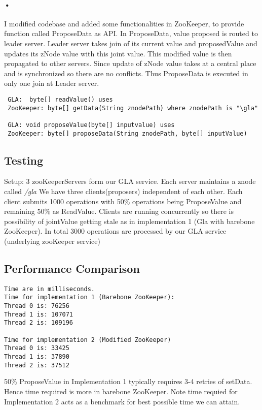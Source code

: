 \documentclass[a4paper,12pt]{report}
\begin{document}
\paragraph{•}
I modified codebase and added some functionalities in ZooKeeper, to provide function called ProposeData as API. In ProposeData, value proposed is routed to leader server. Leader server takes join of its current value and proposedValue and updates its zNode value with this joint value. This modified value is then propagated to other servers.
Since update of zNode value takes at a central place and is synchronized so there are no conflicts.
Thus ProposeData is executed in only one join at Leader server.
\begin{verbatim}
 GLA:  byte[] readValue() uses
 ZooKeeper: byte[] getData(String znodePath) where znodePath is "\gla"  

 GLA: void proposeValue(byte[] inputvalue) uses
 ZooKeeper: byte[] proposeData(String znodePath, byte[] inputValue)
 \end{verbatim}

\subsection{Testing}
Setup: 
3 zooKeeperServers form our GLA service. Each server maintains a znode called \textit{/gla}
We have three clients(proposers) independent of each other. Each client submits 1000 operations with 50\% operations being ProposeValue and remaining 50\% as ReadValue.
Clients are running concurrently so there is possibility of jointValue getting stale as in implementation 1 (Gla with barebone ZooKeeper).
In total 3000 operations are processed by our GLA service (underlying zooKeeper service)


\subsection{Performance Comparison}
\begin{verbatim}
Time are in milliseconds.
Time for implementation 1 (Barebone ZooKeeper):
Thread 0 is: 76256 
Thread 1 is: 107071 
Thread 2 is: 109196 

Time for implementation 2 (Modified ZooKeeper)
Thread 0 is: 33425
Thread 1 is: 37890
Thread 2 is: 37512
\end{verbatim}
50\% ProposeValue in Implementation 1 typically requires 3-4 retries of setData. Hence time required is more in barebone ZooKeeper. Note time requied for Implementation 2 acts as a benchmark for best possible time we can attain.
\end{document}
